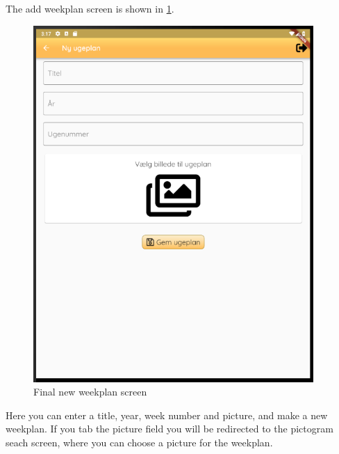 The add weekplan screen is shown in \ref{fig:finalAddWeekplanSelector}.
\begin{figure}[H]
    \begin{center}
        \includegraphics[width=0.95\textwidth]{figures/FinalScreen/addWeekplanScreen.png}
    \end{center}
    \caption{Final new weekplan screen}
    \label{fig:finalAddWeekplanSelector}
\end{figure}
Here you can enter a title, year, week number and picture, and make a new weekplan. If you tab the picture field you will be redirected to the pictogram seach screen, where you can choose a picture for the weekplan. 

